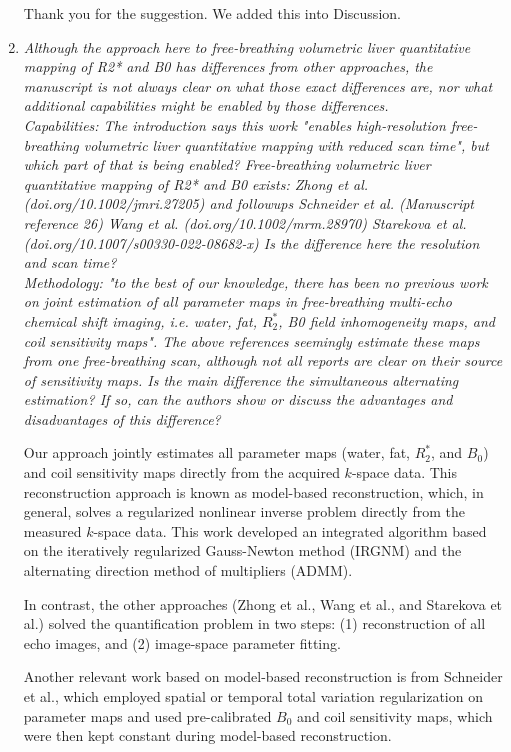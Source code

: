 \documentclass[a4paper,11pt]{report}
\begin{document}
\begin{enumerate}
\hspace{1em} Thank you for the suggestion. We added this into Discussion.

	\item \textit{Although the approach here to free-breathing volumetric liver quantitative mapping of R2* and B0 has differences from other approaches, the manuscript is not always clear on what those exact differences are, nor what additional capabilities might be enabled by those differences. \\
	Capabilities: The introduction says this work "enables high-resolution free-breathing volumetric liver quantitative mapping with reduced scan time", but which part of that is being enabled? Free-breathing volumetric liver quantitative mapping of R2* and B0 exists:
	Zhong et al. (doi.org/10.1002/jmri.27205) and followups
	Schneider et al. (Manuscript reference 26)
	Wang et al. (doi.org/10.1002/mrm.28970)
	Starekova et al. (doi.org/10.1007/s00330-022-08682-x)
	Is the difference here the resolution and scan time?\\
	Methodology: "to the best of our knowledge, there has been no previous work on joint estimation of all parameter maps in free-breathing multi-echo chemical shift imaging, i.e. water, fat, $R_2^*$, B0 field inhomogeneity maps, and coil sensitivity maps". The above references seemingly estimate these maps from one free-breathing scan, although not all reports are clear on their source of sensitivity maps. Is the main difference the simultaneous alternating estimation? If so, can the authors show or discuss the advantages and disadvantages of this difference?}

\hspace{1em} Our approach jointly estimates all parameter maps (water, fat, $R_2^*$, and $B_0$) 
and coil sensitivity maps directly from the acquired $k$-space data. 
This reconstruction approach is known as model-based reconstruction, which, in general, 
solves a regularized nonlinear inverse problem directly from the measured $k$-space data. 
This work developed an integrated algorithm based on 
the iteratively regularized Gauss-Newton method (IRGNM) and 
the alternating direction method of multipliers (ADMM). 

\hspace{1em} In contrast, the other approaches (Zhong et al., Wang et al., and Starekova et al.) 
solved the quantification problem in two steps: 
(1) reconstruction of all echo images, and (2) image-space parameter fitting. 

\hspace{1em} Another relevant work based on model-based reconstruction is from Schneider et al., 
which employed spatial or temporal total variation regularization on parameter maps and used
	pre-calibrated $B_0$ and coil sensitivity maps, 
which were then kept constant during model-based reconstruction.

\end{enumerate}
\end{document}
